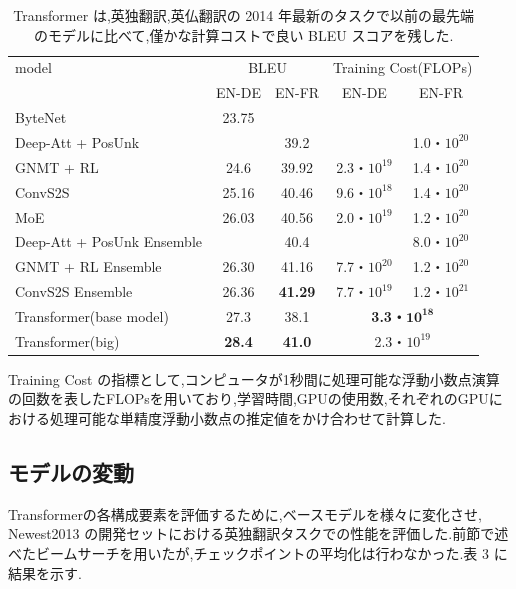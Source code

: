 \documentclass{jarticle}     %
\begin{document}
\begin{table}[h]
  \caption{Transformer は,英独翻訳,英仏翻訳の 2014 年最新のタスクで以前の最先端のモデルに比べて,僅かな計算コストで良い BLEU スコアを残した.}
  \label{table:Transformer}
  \centering
   \begin{tabular}{lcccc}
    \toprule             %
    model & \multicolumn{2}{c}{BLEU} & \multicolumn{2}{l}{Training Cost(FLOPs)}\\
    \cmidrule(lr){2-3}
    \cmidrule(lr){4-5}
     & EN-DE & EN-FR & EN-DE & EN-FR \\
    \midrule             %
    ByteNet\cite{15} & 23.75 & & & \\
    Deep-Att + PosUnk\cite{32} & & 39.2 & & 1.0・$10^{20}$ \\
    GNMT + RL\cite{31} & 24.6 & 39.92 & 2.3・$10^{19}$ & 1.4・$10^{20}$ \\
    ConvS2S\cite{8} & 25.16 & 40.46 & 9.6・$10^{18}$ & 1.4・$10^{20}$ \\
    MoE\cite{26} & 26.03 & 40.56 & 2.0・$10^{19}$ & 1.2・$10^{20}$ \\
    \hline
    Deep-Att + PosUnk Ensemble\cite{32} & & 40.4 & & 8.0・$10^{20}$ \\
    GNMT + RL Ensemble\cite{31} & 26.30 & 41.16 & 7.7・$10^{20}$ & 1.2・$10^{20}$ \\
    ConvS2S Ensemble\cite{8} & 26.36 & \textbf{41.29} & 7.7・$10^{19}$ & 1.2・$10^{21}$ \\
    \hline
    Transformer(base model) & 27.3 & 38.1 & \multicolumn{2}{c}{\bf{3.3・$\mathbf{10^{18}}$}} \\
    Transformer(big) & \textbf{28.4} & \textbf{41.0} &  \multicolumn{2}{c}{2.3・$10^{19}$}\\ 
    \bottomrule          %
   \end{tabular}
 \end{table}

Training Cost の指標として,コンピュータが1秒間に処理可能な浮動小数点演算の回数を表したFLOPs\cite{FLOPS}を用いており,学習時間,GPUの使用数,それぞれのGPUにおける処理可能な単精度浮動小数点の推定値をかけ合わせて計算した.

\subsection{モデルの変動}
Transformerの各構成要素を評価するために,ベースモデルを様々に変化させ, Newest2013 の開発セットにおける英独翻訳タスクでの性能を評価した.前節で述べたビームサーチを用いたが,チェックポイントの平均化は行わなかった.表 3 に結果を示す.
\end{document}
